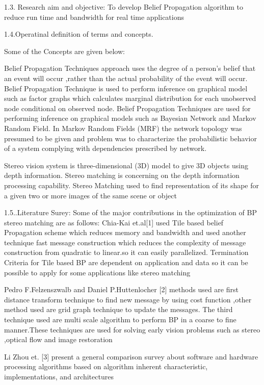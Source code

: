 1.3. Research aim and objective:
To develop Belief Propagation algorithm  to reduce run time and bandwidth for real time applications


1.4.Operatinal definition of terms and concepts.

Some of the Concepts are given  below:

Belief Propagation Techniques approach uses the degree of a person's belief that an event will occur ,rather than the actual probability  of the event will occur.
Belief Propagation Technique is used to perform inference on graphical  model  such as factor graphs which calculates marginal distribution for each unobserved node
conditional on observed node.
Belief Propagation Techniques  are used for performing inference on graphical models such as Bayesian Network and Markov Random Field. In Markov Random  Fields (MRF) the network topology was presumed to be given and problem was to characterize the probabilistic  behavior  of a system complying with dependencies prescribed by network.

Stereo  vision system is three-dimensional (3D) model to give 3D objects using depth information. Stereo matching is concerning on the depth information processing capability. Stereo Matching used to find representation of its shape for a given two or more images of the same scene or object




1.5..Literature Surey:
Some of the major contributions in the optimization of BP stereo matching are as follows:
Chia-Kai et.al[1] used Tile based belief Propagation scheme which reduces memory
 and bandwidth and used another technique fast message construction which reduces the complexity of message construction from quadratic to linear.so it can easily parallelized.
Termination Criteria for Tile based BP are dependent on application and data so it can be possible to apply for some applications like stereo matching

Pedro F.Felzenszwalb and Daniel P.Huttenlocher [2] methods used are first distance transform technique to find new message by using cost function ,other method used are grid graph technique to update the messages.
The third technique used are multi scale algorithm to perform BP in a coarse to fine manner.These techniques are used for solving early vision problems such as stereo ,optical flow and image restoration

Li Zhou et. [3] present a general comparison survey about software and hardware processing algorithms based on algorithm inherent characteristic, implementations, and architectures

